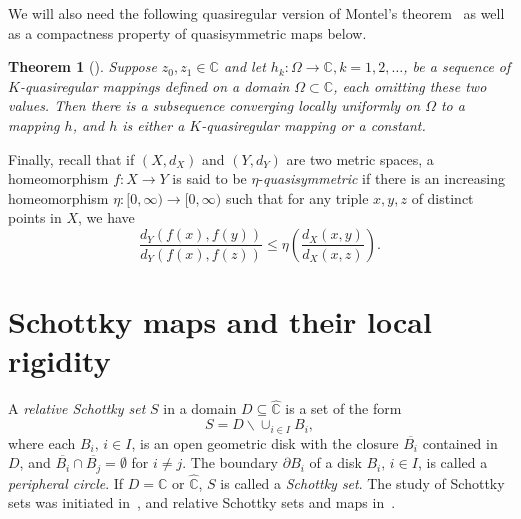 \documentclass[12pt]{amsart}
\newtheorem{thm}{Theorem}[section]
\newtheorem{lem}[thm]{Lemma}
\newcommand{\C}{\mathbb{C}}
\newcommand{\N}{\mathbb{N}}
\newcommand{\hC}{\widehat{\C}}
\newcommand{\sub}{\subseteq }
\newcommand{\co}{\colon}
\begin{document}
We will also need the following quasiregular version of Montel’s theorem~\cite[Corollary 5.5.7]{AIM} as well as a compactness property of quasisymmetric maps below. 
\begin{thm}[\cite{AIM}]\label{thm:converge1}
Suppose $z_0, z_1\in\C$ and let $h_k\colon\Omega\to \C, k = 1, 2,\dots$, be a
sequence of $K$-quasiregular mappings defined on a domain $\Omega\subset \C$, each omitting
these two values. Then there is a subsequence converging locally uniformly on $\Omega$
to a mapping $h$,
and $h$ is either a $K$-quasiregular mapping or a constant.
\end{thm}


Finally, recall that if $(X, d_X)$ and $(Y, d_Y)$ are two metric spaces, a homeomorphism $f\co X \to Y$ is said to be $\eta$-\emph{quasisymmetric} if there is an increasing homeomorphism $\eta\co [0, \infty) \to [0, \infty)$ such that for any triple $x, y, z$ of distinct points in $X$, we have
$$\displaystyle {\frac {d_{Y}(f(x),f(y))}{d_{Y}(f(x),f(z))}}\leq \eta \left({\frac {d_{X}(x,y)}{d_{X}(x,z)}}\right).$$


\section{Schottky maps and their local rigidity}\label{sec:Sch}
\noindent A \textit{relative Schottky set} $S$ in a domain $D\sub \hC$ is a set of the form 
$$S=D\backslash \cup_{i\in I}B_i,$$
where each $B_i,\, i\in I$, is an open geometric disk with the closure $\overline{B_i}$ contained in $D$, and $\overline{B_i}\cap\overline{B_j}=\emptyset$ for $i\neq j$.
The boundary $\partial B_i$ of a disk $B_i,\, i\in I$, is called a \textit{peripheral circle}. If $D=\C$  or $\hC$, $S$ is called a \textit{Schottky set}. The study of Schottky sets was initiated in~\cite{BKM}, and relative Schottky sets and maps in~\cite{Me1, Me2}.
\end{document}
